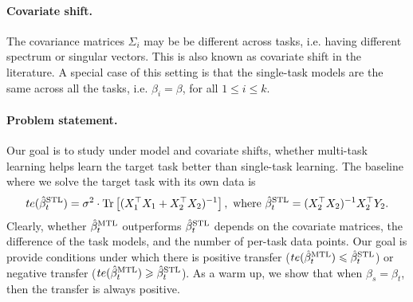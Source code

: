 

\paragraph{Covariate shift.}
The covariance matrices $\Sigma_i$ may be be different across tasks, i.e. having different spectrum or singular vectors.
This is also known as covariate shift in the literature.
A special case of this setting is that the single-task models are the same across all the tasks, i.e. $\beta_i = \beta$, for all $1\le i\le k$.

\paragraph{Problem statement.} Our goal is to study under model and covariate shifts, whether multi-task learning helps learn the target task better than single-task learning.
The baseline where we solve the target task with its own data is
\begin{align*}
	te(\hat{\beta}_t^{\text{STL}}) = \sigma^2 \cdot \operatorname{Tr}\left[(X_1^{\top}X_1 + X_2^{\top}X_2)^{-1}\right], \text{ where } \hat{\beta}_t^{\text{STL}} = (X_2^{\top}X_2)^{-1} X_2^{\top}Y_2.
\end{align*}
Clearly, whether $\hat{\beta}_t^{\text{MTL}}$ outperforms $\hat{\beta}_t^{\text{STL}}$ depends on the covariate matrices, the difference of the task models, and the number of per-task data points.
Our goal is provide conditions under which there is positive transfer ($te(\hat{\beta}_t^{\text{MTL}}) \leqslant \hat{\beta}_t^{\text{STL}}$) or negative transfer ($te(\hat{\beta}_t^{\text{MTL}}) \geqslant \hat{\beta}_t^{\text{STL}}$).
As a warm up, we show that when $\beta_s = \beta_t$, then the transfer is always positive.

